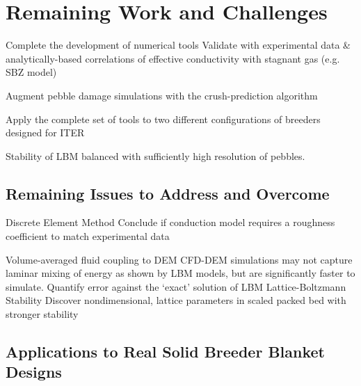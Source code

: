 \chapter{Remaining Work and Challenges}\label{sec:remaining}

Complete the development of numerical tools
Validate with experimental data \& analytically-based correlations of effective conductivity with stagnant gas (e.g. SBZ model)

Augment pebble damage simulations with the crush-prediction algorithm

Apply the complete set of tools to two different configurations of breeders designed for ITER


Stability of LBM balanced with sufficiently high resolution of pebbles.

\section{Remaining Issues to Address and Overcome}
Discrete Element Method
Conclude if conduction model requires a roughness coefficient to match experimental data

Volume-averaged fluid coupling to DEM
CFD-DEM simulations may not capture laminar mixing of energy as shown by LBM models, but are significantly faster to simulate. Quantify error against the ‘exact’ solution of LBM
Lattice-Boltzmann Stability
Discover nondimensional, lattice parameters in scaled packed bed with stronger stability


\section{Applications to Real Solid Breeder Blanket Designs}\label{sec:applied-studies}

